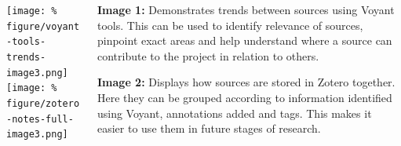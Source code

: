 \documentclass[unknownkeysallowed,usepdftitle=false, aspectratio=169, parskip=full]{beamer}
\newcommand{\secvariable}{nothing}
\newcommand{\mysection}[1]{\renewcommand{\secvariable}{#1}
}
\begin{document}
\begin{frame}\label{\secvariable}
  \begin{columns}[t]
  \begin{column}[c]{0.45\textwidth}
\texttt{[image: \%
figure/voyant-tools-trends-image3.png]}\\
\vspace{12pt}
\texttt{[image: \%
figure/zotero-notes-full-image3.png]}
    \end{column}
    \begin{column}[c]{0.50\textwidth}
    \parbox{\linewidth}{
      
  
 \textbf{Image 1:} Demonstrates trends between sources using Voyant tools. This  can be used to identify relevance of sources, pinpoint exact areas and help understand where a source can contribute to the project in relation to others.    
\vspace{8pt}

\textbf{Image 2:} Displays how sources are stored in Zotero together. Here they can be grouped according to information identified using Voyant, annotations added and tags. This makes it easier to use them in future stages of research.
             
 
   
      }
    \end{column}
    
  \end{columns}

  
\end{frame}
\mysection{radar}
\end{document}
